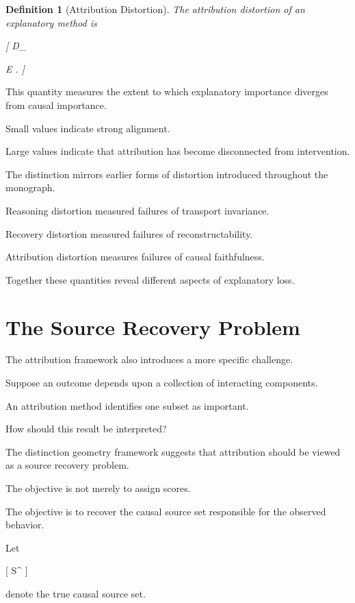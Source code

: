 \documentclass[11pt,oneside,openany]{book}
\newtheorem{definition}{Definition}[chapter] \newtheorem{theorem}{Theorem}[chapter] \newtheorem{proposition}{Proposition}[chapter] \newtheorem{lemma}{Lemma}[chapter] \newtheorem{corollary}{Corollary}[chapter] \newtheorem{remark}{Remark}[chapter]
\begin{document}
\begin{definition}[Attribution Distortion]

The attribution distortion of an explanatory method is

[
D_{}

\mathbb E
.
]

\end{definition}

This quantity measures the extent to which explanatory importance diverges from causal importance.

Small values indicate strong alignment.

Large values indicate that attribution has become disconnected from intervention.

The distinction mirrors earlier forms of distortion introduced throughout the monograph.

Reasoning distortion measured failures of transport invariance.

Recovery distortion measured failures of reconstructability.

Attribution distortion measures failures of causal faithfulness.

Together these quantities reveal different aspects of explanatory loss.

\section{The Source Recovery Problem}

The attribution framework also introduces a more specific challenge.

Suppose an outcome depends upon a collection of interacting components.

An attribution method identifies one subset as important.

How should this result be interpreted?

The distinction geometry framework suggests that attribution should be viewed as a source recovery problem.

The objective is not merely to assign scores.

The objective is to recover the causal source set responsible for the observed behavior.

Let

[
S^\star
]

denote the true causal source set.
\end{document}
